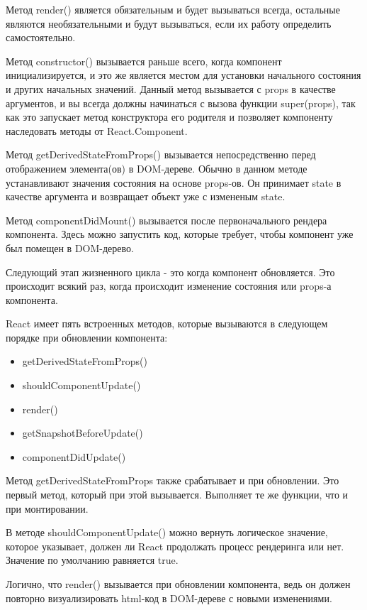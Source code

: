 \documentclass[a4paper,12pt]{diplom}
\begin{document}
Метод render() является обязательным и будет вызываться всегда, остальные являются необязательными и будут вызываться, если их работу определить самостоятельно.

Метод constructor() вызывается раньше всего, когда компонент инициализируется, и это же является местом для установки начального состояния и других начальных значений. Данный метод вызывается с props в качестве аргументов, и вы всегда должны начинаться с вызова функции super(props), так как это запускает метод конструктора его родителя и позволяет компоненту наследовать методы от React.Component.

Метод getDerivedStateFromProps() вызывается непосредственно перед отображением элемента(ов) в DOM-дереве. Обычно в данном методе устанавливают значения состояния на основе props-ов. Он принимает state в качестве аргумента и возвращает объект уже с измененым state.

Метод componentDidMount() вызывается после первоначального рендера компонента.
Здесь можно запустить код, которые требует, чтобы компонент уже был помещен в DOM-дерево.

Следующий этап жизненного цикла - это когда компонент обновляется.
Это происходит всякий раз, когда происходит изменение состояния или props-а компонента.

React имеет пять встроенных методов, которые вызываются в следующем порядке при обновлении компонента:

\begin{itemize}
  \item getDerivedStateFromProps()
  \item shouldComponentUpdate()
  \item render()
  \item getSnapshotBeforeUpdate()
  \item componentDidUpdate()
\end{itemize}

Метод getDerivedStateFromProps также срабатывает и при обновлении. Это первый метод, который при этой вызывается.
Выполняет те же функции, что и при монтировании.

В методе shouldComponentUpdate() можно вернуть логическое значение, которое указывает, должен ли React продолжать процесс рендеринга или нет.
Значение по умолчанию равняется true.

Логично, что render() вызывается при обновлении компонента, ведь он должен повторно визуализировать html-код в DOM-дереве с новыми изменениями.
\end{document}
